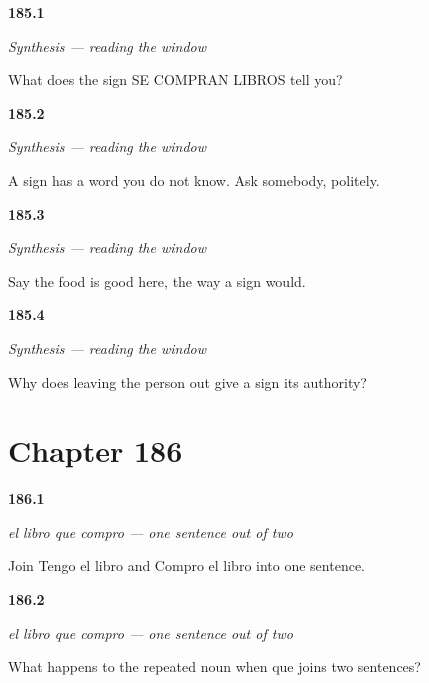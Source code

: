 \noindent\begin{minipage}[t]{\linewidth}
\raggedright
\hypertarget{review-ES-C52-sintesis-el-letrero-read}{\textbf{185.1}} \emph{Synthesis — reading the window}\par
\small What does the sign SE COMPRAN LIBROS tell you?
\end{minipage}\par\medskip

\noindent\begin{minipage}[t]{\linewidth}
\raggedright
\hypertarget{review-ES-C52-sintesis-el-letrero-unknown}{\textbf{185.2}} \emph{Synthesis — reading the window}\par
\small A sign has a word you do not know. Ask somebody, politely.
\end{minipage}\par\medskip

\noindent\begin{minipage}[t]{\linewidth}
\raggedright
\hypertarget{review-ES-C52-sintesis-el-letrero-eat}{\textbf{185.3}} \emph{Synthesis — reading the window}\par
\small Say the food is good here, the way a sign would.
\end{minipage}\par\medskip

\noindent\begin{minipage}[t]{\linewidth}
\raggedright
\hypertarget{review-ES-C52-sintesis-el-letrero-authority}{\textbf{185.4}} \emph{Synthesis — reading the window}\par
\small Why does leaving the person out give a sign its authority?
\end{minipage}\par\medskip

\section*{Chapter 186}

\noindent\begin{minipage}[t]{\linewidth}
\raggedright
\hypertarget{review-ES-C53-que-relativo-join}{\textbf{186.1}} \emph{el libro que compro — one sentence out of two}\par
\small Join Tengo el libro and Compro el libro into one sentence.
\end{minipage}\par\medskip

\noindent\begin{minipage}[t]{\linewidth}
\raggedright
\hypertarget{review-ES-C53-que-relativo-what}{\textbf{186.2}} \emph{el libro que compro — one sentence out of two}\par
\small What happens to the repeated noun when que joins two sentences?
\end{minipage}\par\medskip

